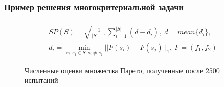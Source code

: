 \documentclass[aspectratio=1610]{beamer}
\begin{document}
\begin{frame}
  \frametitle{Пример решения многокритериальной задачи}
  \vspace*{-1.0cm}
  \begin{displaymath}
    \begin{array}{cr}\\
      SP(S)=\sqrt{\frac{1}{|S|-1} \sum_{i=1}^{|S|} (\overline{d}-d_i)},\:\overline{d}=mean\{d_i\}, \\
      d_i=\min_{s_i,s_j\in S:s_i\ne s_j}||F(s_i)-F(s_j)||_1,\: F=(f_1,f_2)
    \end{array}
  \end{displaymath}

  \begin{figure}[ht]
      \centering
      \vspace*{-0.5cm}
      \caption{Численные оценки множества Парето, полученные после 2500 испытаний}
      \label{fig:mco_pareto}
  \end{figure}
\end{frame}
\end{document}
